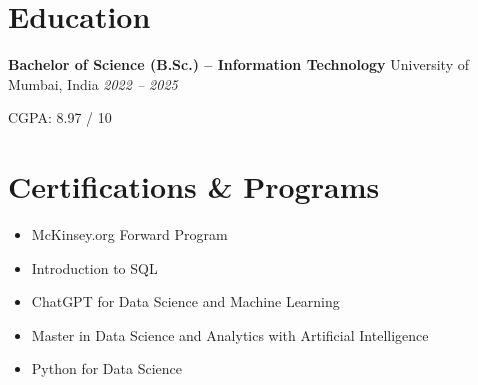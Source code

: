 \documentclass[10pt,a4paper]{article}
\newcommand{\entry}[3]{%
  \textbf{#1} \textbar{} #2 \hfill \textit{#3}\par
}
\begin{document}
\section{Education}
\entry{Bachelor of Science (B.Sc.) -- Information Technology}{University of Mumbai, India}{2022 -- 2025}
CGPA: 8.97 / 10

\section{Certifications \& Programs}
\begin{itemize}
  \item McKinsey.org Forward Program
  \item Introduction to SQL
  \item ChatGPT for Data Science and Machine Learning
  \item Master in Data Science and Analytics with Artificial Intelligence
  \item Python for Data Science
\end{itemize}
\end{document}
